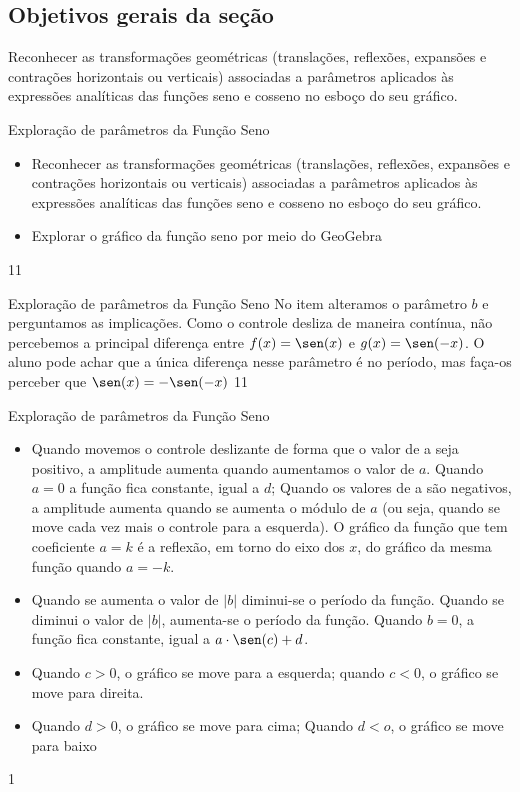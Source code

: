 \clearpage
\def\currentcolor{session1}

\begin{texto}
{
	\subsection{Objetivos gerais da seção}
	Reconhecer as transformações geométricas (translações, reflexões, expansões e contrações horizontais ou verticais) associadas a parâmetros aplicados às expressões analíticas das funções seno e cosseno no esboço do seu gráfico.}
\end{texto}
\begin{objectives}{Exploração de parâmetros da Função Seno}
{
\begin{itemize}
\item Reconhecer as transformações geométricas (translações,
reflexões, expansões e contrações horizontais ou verticais)
associadas a parâmetros aplicados às expressões analíticas
das funções seno e cosseno no esboço do seu gráfico.
\item Explorar o gráfico da função seno por meio do GeoGebra
\end{itemize}
}{1}{1}
\end{objectives}
\begin{sugestions}{Exploração de parâmetros da Função Seno}
{
No item  %
alteramos o parâmetro $b$ e perguntamos as implicações. Como o controle desliza de maneira contínua, não percebemos a principal diferença entre $f(x) = \sen(x)$ e $g(x)= \sen(-x)$. O aluno pode achar que a única diferença nesse parâmetro é no período, mas faça-os perceber que $\sen(x)=-\sen(-x)$
}{1}{1}
\end{sugestions}
\clearmargin\clearmargin
\begin{answer}{Exploração de parâmetros da Função Seno}
{
\begin{itemize}
\item Quando movemos o controle deslizante de forma que o valor de a seja positivo, a amplitude aumenta quando aumentamos o valor de $a$. Quando $a=0$ a função fica constante, igual a $d$; Quando os valores de a são negativos, a amplitude aumenta quando se aumenta o módulo de $a$ (ou seja, quando se move cada vez mais o controle para a esquerda). O gráfico da função que tem coeficiente $a = k$ é a reflexão, em torno do eixo dos $x$, do gráfico da mesma função quando $a = -k$.
\item Quando se aumenta o valor de $|b|$ diminui-se o período da função. Quando se diminui o valor de $|b|$, aumenta-se o período da função. Quando $b=0$, a função fica constante, igual a $a\cdot\sen(c)+d$.
\item Quando $c>0$, o gráfico se move para a esquerda; quando $c<0$, o gráfico se move para direita.
\item Quando $d>0$, o gráfico se move para cima; Quando $d<o$, o gráfico se move para baixo
\end{itemize}
}{1}
\end{answer}


